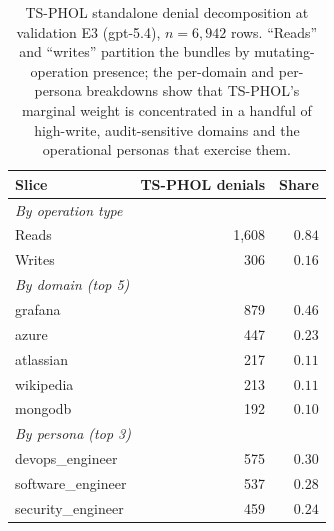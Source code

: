 \documentclass[10pt,a4paper,twocolumn]{article}
\begin{document}
\begin{table}[H]
\centering
\caption{TS-PHOL standalone denial decomposition at validation E3 (gpt-5.4), $n=6{,}942$ rows. ``Reads'' and ``writes'' partition the bundles by mutating-operation presence; the per-domain and per-persona breakdowns show that TS-PHOL's marginal weight is concentrated in a handful of high-write, audit-sensitive domains and the operational personas that exercise them.}
\label{tab:tsphol_decomposition}
\small
\setlength{\tabcolsep}{4pt}
\begin{tabular}{@{}lrr@{}}
\toprule
\textbf{Slice} & \textbf{TS-PHOL denials} & \textbf{Share} \\
\midrule
\multicolumn{3}{l}{\textit{By operation type}} \\
Reads  & 1{,}608 & $0.84$ \\
Writes &   306   & $0.16$ \\
\midrule
\multicolumn{3}{l}{\textit{By domain (top 5)}} \\
grafana    & 879 & $0.46$ \\
azure      & 447 & $0.23$ \\
atlassian  & 217 & $0.11$ \\
wikipedia  & 213 & $0.11$ \\
mongodb    & 192 & $0.10$ \\
\midrule
\multicolumn{3}{l}{\textit{By persona (top 3)}} \\
devops\_engineer   & 575 & $0.30$ \\
software\_engineer & 537 & $0.28$ \\
security\_engineer & 459 & $0.24$ \\
\bottomrule
\end{tabular}
\end{table}
\end{document}
